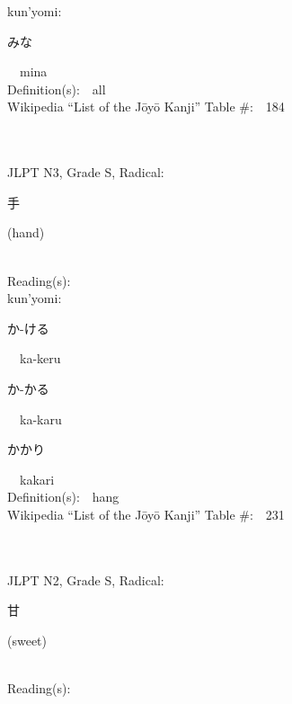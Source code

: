 \begin{multicols}{2}
{\hspace*{1em}}kun'yomi:\ \ \\
{\hspace*{2em}}{\begin{CJK}{UTF8}{min} みな \end{CJK}}\ \ mina\ \ \\
Definition(s):\ \ all \\
Wikipedia ``List of the J\=oy\=o Kanji'' Table \#:\ \ 184 \\
\ \ \\
{\fontsize{34pt}{40pt}  }\ \ \\  %
{JLPT N3, Grade S, Radical:\ \ {\begin{CJK}{UTF8}{min} 手 \end{CJK}} (hand) } \\
Reading(s):\ \ \\
{\hspace*{1em}}kun'yomi:\ \ \\
{\hspace*{2em}}{\begin{CJK}{UTF8}{min} か-ける \end{CJK}}\ \ ka-keru\ \ \\
{\hspace*{2em}}{\begin{CJK}{UTF8}{min} か-かる \end{CJK}}\ \ ka-karu\ \ \\
{\hspace*{2em}}{\begin{CJK}{UTF8}{min} かかり \end{CJK}}\ \ kakari\ \ \\
Definition(s):\ \ hang \\
Wikipedia ``List of the J\=oy\=o Kanji'' Table \#:\ \ 231 \\
\ \ \\
{\fontsize{34pt}{40pt}  }\ \ \\  %
{JLPT N2, Grade S, Radical:\ \ {\begin{CJK}{UTF8}{min} 甘 \end{CJK}} (sweet) } \\
Reading(s):\ \ \\

\end{multicols}
